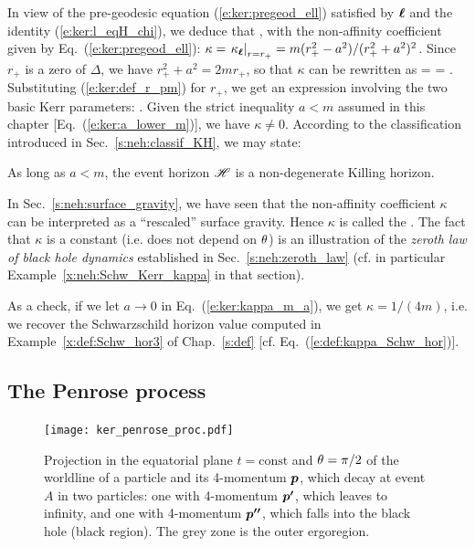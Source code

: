 In view of the pre-geodesic equation (\ref{e:ker:pregeod_ell}) satisfied
by $\bm{\ell}$ and the identity (\ref{e:ker:l_eqH_chi}), we deduce that
\be \label{e:ker:pregeod_chi}
    \encadre{ \wnab_{\w{\chi}}\, \w{\chi} \equalH \kappa \, \w{\chi} },
\ee
with the non-affinity coefficient given by Eq.~(\ref{e:ker:pregeod_ell}):
$\kappa = \left. \kappa_{\bm{\ell}} \right| _{r=r_+} = m(r_+^2-a^2)/(r_+^2+a^2)^2$.
Since $r_+$ is a zero of $\Delta$, we have $r_+^2 + a^2 = 2 m r_+$, so that
$\kappa$ can be rewritten as
\be \label{e:ker:kappa_rp_m_a}
    \kappa =  =  .
\ee
Substituting (\ref{e:ker:def_r_pm}) for $r_+$, we get an expression involving
the two basic Kerr parameters:
\be \label{e:ker:kappa_m_a}
     .
\ee
Given the strict inequality $a<m$ assumed in this chapter [Eq.~(\ref{e:ker:a_lower_m})],
we have $\kappa\not=0$. According to the classification introduced in
Sec.~\ref{s:neh:classif_KH}, we may state:
\begin{prop}
As long as $a<m$, the event horizon $\mathscr{H}$ is a non-degenerate Killing horizon.
\end{prop}
In Sec.~\ref{s:neh:surface_gravity}, we have seen that the non-affinity coefficient
$\kappa$ can be interpreted as a ``rescaled'' surface gravity. Hence $\kappa$
is called
the .
The fact that $\kappa$ is a constant (i.e. does not depend on $\theta$) is
an illustration of the \emph{zeroth law of black hole dynamics}
established in Sec.~\ref{s:neh:zeroth_law} (cf. in particular
Example~\ref{x:neh:Schw_Kerr_kappa} in that section).
\begin{remark}
As a check, if we let $a\rightarrow 0$ in Eq.~(\ref{e:ker:kappa_m_a}), we get
$\kappa = 1/(4m)$, i.e. we recover the Schwarzschild horizon value computed in
Example~\ref{x:def:Schw_hor3} of Chap.~\ref{s:def} [cf. Eq.~(\ref{e:def:kappa_Schw_hor})].
\end{remark}

\subsection{The Penrose process} \label{s:ker:Penrose_proc}

\begin{figure}
\centerline{\texttt{[image: ker\_penrose\_proc.pdf]}}
\caption[]{\label{f:ker:penrose_proc} \footnotesize
Projection in the equatorial plane $t=\mathrm{const}$
and $\theta=\pi/2$ of the worldline of a particle and its 4-momentum $\bm{p}$,
which decay at event $A$ in two particles: one with 4-momentum
$\bm{p'}$, which leaves to infinity, and one with 4-momentum
$\bm{p''}$, which falls into the black hole (black region).
The grey zone is the outer ergoregion.
}
\end{figure}

